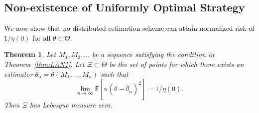 \documentclass[letterpaper, 10pt]{IEEEtran}      %
\newtheorem{thm}{\bf{Theorem}}
\begin{document}
\subsection*{Non-existence of Uniformly Optimal Strategy}
We now show that no distributed estimation scheme can attain normalized risk of $1/\eta(0)$ for all $\theta \in \Theta$. 

\begin{thm} \label{thm:non_existence}
Let $M_1,M_2,\ldots $ be a sequence satisfying the condition in Theorem~\ref{thm:LAN1}. Let $\Xi \subset \Theta $ be the set of points for which there exists an estimator $\hat{\theta}_n = \hat{\theta}(M_1,\ldots,M_n)$ such that
\[
\lim_{n\to \infty} \mathbb E \left[ n \left(\theta - \hat{\theta}_n \right)^2 \right] = 1/\eta(0). 
\]
Then $\Xi$ has Lebesgue measure zero. 
\end{thm}
\end{document}
